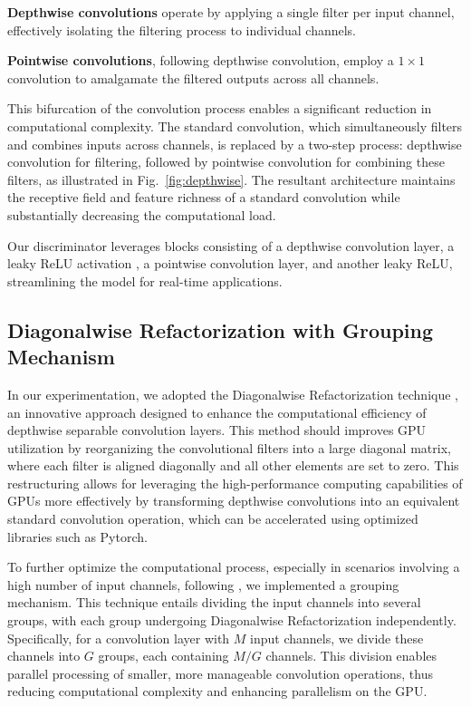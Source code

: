 \documentclass[conference]{IEEEtran}
\begin{document}
\textbf{Depthwise convolutions} operate by applying a single filter per input channel, effectively isolating the filtering process to individual channels.

\textbf{Pointwise convolutions}, following depthwise convolution, employ a $1 \times 1$ convolution to amalgamate the filtered outputs across all channels.

This bifurcation of the convolution process enables a significant reduction in computational complexity. The standard convolution, which simultaneously filters and combines inputs across channels, is replaced by a two-step process: depthwise convolution for filtering, followed by pointwise convolution for combining these filters, as illustrated in Fig.~\ref{fig:depthwise}. The resultant architecture maintains the receptive field and feature richness of a standard convolution while substantially decreasing the computational load.

Our discriminator leverages blocks consisting of a depthwise convolution layer, a leaky ReLU activation \cite{b9}, a pointwise convolution layer, and another leaky ReLU, streamlining the model for real-time applications.

\subsection{Diagonalwise Refactorization with Grouping Mechanism}
In our experimentation, we adopted the Diagonalwise Refactorization technique \cite{b10}, an innovative approach designed to enhance the computational efficiency of depthwise separable convolution layers. This method should improves GPU utilization by reorganizing the convolutional filters into a large diagonal matrix, where each filter is aligned diagonally and all other elements are set to zero. This restructuring allows for leveraging the high-performance computing capabilities of GPUs more effectively by transforming depthwise convolutions into an equivalent standard convolution operation, which can be accelerated using optimized libraries such as Pytorch.

To further optimize the computational process, especially in scenarios involving a high number of input channels, following \cite{b10}, we implemented a grouping mechanism. This technique entails dividing the input channels into several groups, with each group undergoing Diagonalwise Refactorization independently. Specifically, for a convolution layer with $M$ input channels, we divide these channels into $G$ groups, each containing $M/G$ channels. This division enables parallel processing of smaller, more manageable convolution operations, thus reducing computational complexity and enhancing parallelism on the GPU.
\end{document}

